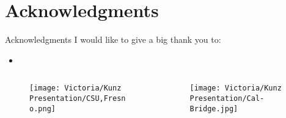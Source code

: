 \documentclass{beamer}
\begin{document}
\section{Acknowledgments}
\begin{frame}{Acknowledgments}
I would like to give a big thank you to:
\begin{itemize}
    \item 
\end{itemize}
\begin{columns}[c]
            \begin{column}{.25\textwidth}
            \begin{figure}
                \centering
                \texttt{[image: Victoria/Kunz Presentation/CSU,Fresno.png]}
            \end{figure}      
            \end{column}
            \begin{column}{.25\textwidth}
            \begin{figure}
                \centering
                \texttt{[image: Victoria/Kunz Presentation/Cal-Bridge.jpg]}
            \end{figure}
            \end{column}
        \end{columns}

\end{frame}
\end{document}
